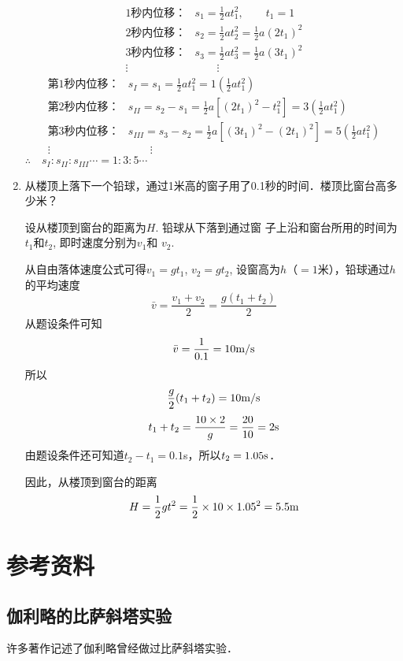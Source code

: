 \begin{enumerate}
\begin{solution}
\[\begin{split}
    \text{1秒内位移：} & s_1=\frac{1}{2}at^2_1, \qquad t_1=1\\
    \text{2秒内位移：} & s_2=\frac{1}{2}at^2_2=\frac{1}{2}a(2t_1)^2\\
    \text{3秒内位移：} & s_3=\frac{1}{2}at^2_3=\frac{1}{2}a(3t_1)^2\\
    \vdots& \qquad \vdots
\end{split}\]
\[\begin{split}
    \text{第1秒内位移：} & s_I=s_1=\frac{1}{2}at^2_1=1\left(\frac{1}{2}at^2_1\right)\\
    \text{第2秒内位移：} & s_{II}=s_2-s_1=\frac{1}{2}a\left[(2t_1)^2-t^2_1\right]=3\left(\frac{1}{2}at^2_1\right)\\
    \text{第3秒内位移：} & s_{III}=s_3-s_2=\frac{1}{2}a\left[(3t_1)^2-(2t_1)^2\right]=5\left(\frac{1}{2}at^2_1\right)\\
    \vdots& \qquad \vdots
\end{split}\]
$\therefore\quad s_I:s_{II}:s_{III}\cdots=1:3:5\cdots$
\end{solution}
	\item 从楼顶上落下一个铅球，通过1米高的窗子用了0.1秒的时间．楼顶比窗台高多少米？

    \begin{solution}
设从楼顶到窗台的距离为$H$. 铅球从下落到通过窗
子上沿和窗台所用的时间为$t_1$和$t_2$, 即时速度分别为$v_1$和
$v_2$.

从自由落体速度公式可得$v_1=gt_1$, $v_2=gt_2$, 
设窗高为$h$（$=1$米），铅球通过$h$的平均速度
\[\bar v=\frac{v_1+v_2}{2}=\frac{g(t_1+t_2)}{2}\]
从题设条件可知
\[\bar v=\frac{1}{0.1}=10\text{m}/\text{s}\]
所以
\[\frac{g}{2}(t_1+t_2)=10\text{m}/\text{s}\]
\[t_1+t_2=\frac{10\times 2}{g}=\frac{20}{10}=2{\rm s}\]
由题设条件还可知道$t_2-t_1=0.1$s，所以$t_2=1.05{\rm s}$．

因此，从楼顶到窗台的距离
\[H=\frac{1}{2}gt^2=\frac{1}{2}\times 10\times 1.05^2=5.5{\rm m}\]   \end{solution}
\end{enumerate}

\section{参考资料}
\subsection{伽利略的比萨斜塔实验}
许多著作记述了伽利略曾经做过比萨斜塔实验．

